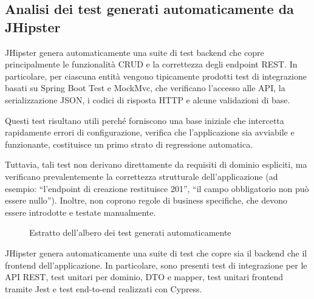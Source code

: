 \subsection{Analisi dei test generati automaticamente da JHipster}
\label{subsec:test-generati}

JHipster genera automaticamente una suite di test backend che copre principalmente le funzionalità CRUD e la correttezza degli endpoint REST. In particolare, per ciascuna entità vengono tipicamente prodotti test di integrazione basati su Spring Boot Test e MockMvc, che verificano l’accesso alle API, la serializzazione JSON, i codici di risposta HTTP e alcune validazioni di base.

Questi test risultano utili perché forniscono una base iniziale che intercetta rapidamente errori di configurazione, verifica che l’applicazione sia avviabile e funzionante, costituisce un primo strato di regressione automatica.

Tuttavia, tali test non derivano direttamente da requisiti di dominio espliciti, ma verificano prevalentemente la correttezza strutturale dell’applicazione (ad esempio: ``l’endpoint di creazione restituisce 201'', ``il campo obbligatorio non può essere nullo''). Inoltre, non coprono regole di business specifiche, che devono essere introdotte e testate manualmente.

\begin{figure}[H]
\caption{Estratto dell’albero dei test generati automaticamente}
\label{fig:test-tree}
\end{figure}

JHipster genera automaticamente una suite di test che copre sia il backend che il frontend dell'applicazione. In particolare, sono presenti test di integrazione per le API REST, test unitari per dominio, DTO e mapper, test unitari frontend tramite Jest e test end-to-end realizzati con Cypress.

